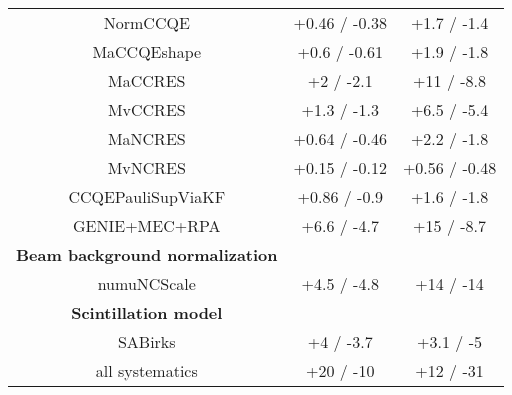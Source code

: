 \begin{table*}[t]
\begin{tabular}{c c c}
    NormCCQE& +0.46 / -0.38& +1.7 / -1.4 \\
    MaCCQEshape& +0.6 / -0.61& +1.9 / -1.8 \\
    MaCCRES& +2 / -2.1& +11 / -8.8 \\
    MvCCRES& +1.3 / -1.3& +6.5 / -5.4 \\
    MaNCRES& +0.64 / -0.46& +2.2 / -1.8 \\
    MvNCRES& +0.15 / -0.12& +0.56 / -0.48 \\
    CCQEPauliSupViaKF& +0.86 / -0.9& +1.6 / -1.8 \\
    \hline
    GENIE+MEC+RPA& +6.6 / -4.7& +15 / -8.7 \\
    \hline
    \textbf{Beam background normalization} & & \\
    numuNCScale& +4.5 / -4.8& +14 / -14 \\
    \textbf{Scintillation model} & & \\
    SABirks& +4 / -3.7& +3.1 / -5 \\
    \hline 
    all systematics& +20 / -10& +12 / -31 \\
    \hline
  \end{tabular}
  \label{tab:systShifts}
\end{table*}
















